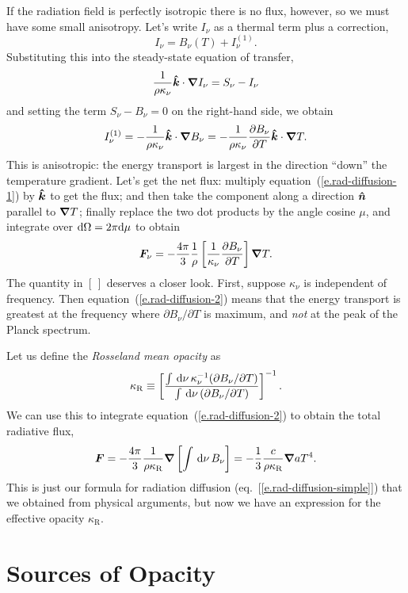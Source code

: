 If the radiation field is perfectly isotropic there is no flux, however, so we must have some small anisotropy. Let's write $I_{\nu}$ as a thermal term plus a correction, 
\[ I_{\nu} = B_{\nu}(T) + I^{(1)}_{\nu}. \]
Substituting this into the steady-state equation of transfer,
\[ \frac{1}{\rho\kappa_{\nu}}\boldsymbol{\hat{k}}\cdot\boldsymbol{\nabla} I_{\nu}  = S_{\nu} - I_{\nu}\]
and setting the term $S_{\nu}-B_{\nu}=0$ on the right-hand side, we obtain
\begin{equation}\label{e.rad-diffusion-1}
I_{\nu}^{(1)} = -\frac{1}{\rho\kappa_{\nu}} \boldsymbol{\hat{k}}\cdot\boldsymbol{\nabla} B_{\nu} = -\frac{1}{\rho\kappa_{\nu}} \frac{\partial B_{\nu}}{\partial T} \boldsymbol{\hat{k}}\cdot\boldsymbol{\nabla} T.
\end{equation}
This is anisotropic: the energy transport is largest in the direction ``down'' the temperature gradient. Let's get the net flux: multiply equation~(\ref{e.rad-diffusion-1}) by $\boldsymbol{\hat{k}}$ to get the flux; and then take the component along a direction $\boldsymbol{\hat{n}}$ parallel to $\boldsymbol{\nabla} T$; finally replace the two dot products by the angle cosine $\mu$, and integrate over $\mathrm{d} \Omega = 2\pi \mathrm{d}\mu$ to obtain
\begin{equation}\label{e.rad-diffusion-2}
\boldsymbol{F}_{\nu} = -\frac{4\pi}{3}\frac{1}{\rho}\left[\frac{1}{\kappa_{\nu}}\frac{\partial B_{\nu}}{\partial T}\right]\boldsymbol{\nabla} T.
\end{equation}
The quantity in $[\,]$ deserves a closer look. First, suppose $\kappa_{\nu}$ is independent of frequency. Then equation~(\ref{e.rad-diffusion-2}) means that the energy transport is greatest at the frequency where $\partial B_{\nu}/\partial T$ is maximum, and \emph{not} at the peak of the Planck spectrum. 

Let us define the \emph{Rosseland mean opacity} as
\[ \kappa_{\mathrm{R}} \equiv \left[\frac{\int\,\mathrm{d}\nu\,\kappa_{\nu}^{-1}(\partial B_{\nu}/\partial T)}{\int \,\mathrm{d}\nu\, (\partial B_{\nu}/\partial T)}\right]^{-1}. \]
We can use this to integrate equation~(\ref{e.rad-diffusion-2}) to obtain the total radiative flux,
\begin{equation}\label{e.rad-flux}
\boldsymbol{F} = - \frac{4\pi}{3} \frac{1}{\rho\kappa_{\mathrm{R}}} \boldsymbol{\nabla}\left[\int\,\mathrm{d}\nu\,B_{\nu}\right] = - \frac{1}{3} \frac{c}{\rho\kappa_{\mathrm{R}}} \boldsymbol{\nabla} aT^{4}.
\end{equation}
This is just our formula for radiation diffusion (eq.~[\ref{e.rad-diffusion-simple}]) that we obtained from physical arguments, but now we have an expression for the effective opacity $\kappa_{\mathrm{R}}$.

\section{Sources of Opacity}\label{s.opacity-sources}

